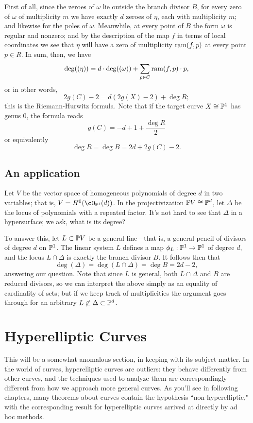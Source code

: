  First of all, since the zeroes of $\omega$ lie outside the branch divisor $B$, for every zero of $\omega$ of multiplicity $m$ we have exactly $d$ zeroes of $\eta$, each with multiplicity $m$; and likewise for the poles of $\omega$. Meanwhile, at every point of $B$ the form $\omega$ is regular and nonzero; and by the description of the map $f$ in terms of local coordinates we see that $\eta$ will have a zero of multiplicity $\ram(f,p)$ at every point $p \in R$. In sum, then, we have
 $$
 \deg((\eta)) = d\cdot \deg((\omega)) + \sum_{p \in C} \ram(f,p) \cdot p,
 $$
 or in other words,
 $$
 2g(C) - 2 = d(2g(X)-2) + \deg R;
  $$
  this is the Riemann-Hurwitz formula. Note that if the target curve $X \cong \PP^1$ has genus 0, the formula reads
  $$
  g(C) = -d  + 1+ \frac{\deg R}{2}
  $$
 or equivalently
 $$
 \deg R = \deg B  = 2d + 2g(C) - 2.
 $$
 
 \subsection{An application}
 
 Let $V$ be the vector space of homogeneous polynomials of degree $d$ in two variables; that is, $V = H^0(\cO_{\PP^1}(d))$. In the projectivization $\PP V \cong \PP^d$, let $\Delta$ be the locus of polynomials with a repeated factor. It's not hard to see that $\Delta$ in a hypersurface; we ask, what is its degree?
 
 To answer this, let $L \subset \PP V$ be a general line---that is, a general pencil of divisors of degree $d$ on $\PP^1$. The linear system $L$ defines a map $\phi_L : \PP^1 \to \PP^1$ of degree $d$, and the locus $L \cap \Delta$ is exactly the branch divisor $B$.
 It follows then that
 $$
 \deg(\Delta) = \deg(L \cap \Delta) = \deg B = 2d-2,
 $$
 answering our question. Note that since $L$ is general, both $L\cap \Delta$ and $B$ are reduced divisors, so we can interpret the above simply as an equality of cardinality of sets; but if we keep track of multiplicities the argument goes through for an arbitrary $L \not\subset \Delta \subset \PP^d$.
 
 \section{Hyperelliptic Curves}
 
 
 This will be a somewhat anomalous section, in keeping with its subject matter. In the world of curves, hyperelliptic curves are outliers: they behave differently from other curves, and the techniques used to analyze them are correspondingly different from how we approach more general curves. As you'll see in following chapters, many theorems about curves contain the hypothesis ``non-hyperelliptic," with the corresponding result for hyperelliptic curves arrived at directly by ad hoc methods.
 
